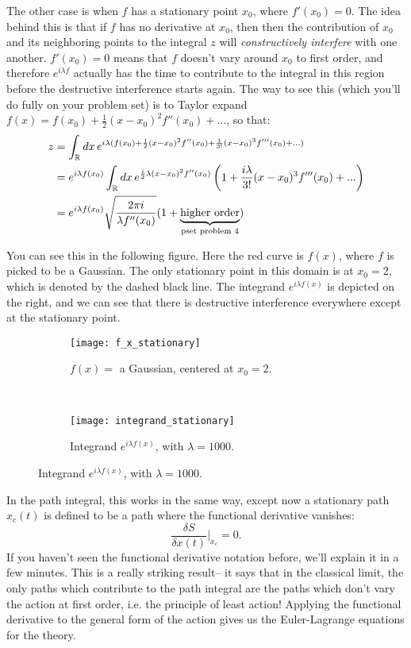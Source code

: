 \documentclass[12pt, oneside]{article}   	%
\theoremstyle{definition}
\begin{document}
\begin{itemize}
	The other case is when $f$ has a stationary point $x_0$, where $f'(x_0) = 0$. The idea behind this is that if $f$ has no derivative at $x_0$, then then the contribution of $x_0$ and its neighboring points to the integral $z$ will \textit{constructively interfere} with one another. $f'(x_0) = 0$ means that $f$ doesn't vary around $x_0$ to first order, and therefore $e^{i\lambda f}$ actually has the time to contribute to the integral in this region before the destructive interference starts again. The way to see this (which you'll do fully on your problem set) is to Taylor expand $f(x) = f(x_0) + \frac{1}{2} (x - x_0)^2 f''(x_0) + ...$, so that:
	\begin{align}
		z &= \int_{\mathbb R} dx \, e^{i\lambda (f(x_0) + \frac{1}{2} (x - x_0)^2 f''(x_0) + \frac{1}{3!} (x - x_0)^3 f'''(x_0) + ...)} \nonumber \\
		&= e^{i\lambda f(x_0)} \int_{\mathbb R} dx \, e^{\frac{i}{2}\lambda (x - x_0)^2 f''(x_0)} \left(1 + \frac{i\lambda}{3!} (x - x_0)^3 f'''(x_0) + ...\right) \\
		&= e^{i\lambda f(x_0)} \sqrt{\frac{2\pi i}{\lambda f''(x_0)}}(1 + \underbrace{\textnormal{higher order}}_{\textnormal{pset problem 4}}) \nonumber
	\end{align}
	
	You can see this in the following figure. Here the red curve is $f(x)$, where $f$ is picked to be a Gaussian. The only stationary point in this domain is at $x_0 = 2$, which is denoted by the dashed black line. The integrand $e^{i\lambda f(x)}$ is depicted on the right, and we can see that there is destructive interference everywhere except at the stationary point. 
	\begin{figure}[H]
		\centering
	   	\begin{subfigure}[t]{0.48\textwidth}
        			\texttt{[image: f\_x\_stationary]}
 			\caption{$f(x) = $ a Gaussian, centered at $x_0 = 2$.}
   		 \end{subfigure}
   		 ~
    		\begin{subfigure}[t]{0.48\textwidth}
        		\texttt{[image: integrand\_stationary]}
       		\caption{Integrand $e^{i \lambda f(x)}$, with $\lambda = 1000$. }
    		\end{subfigure}
	\end{figure}
	
	In the path integral, this works in the same way, except now a stationary path $x_c(t)$ is defined to be a path where the functional derivative vanishes:
	\begin{equation}
		\frac{\delta S}{\delta x(t)}\bigg|_{x_c} = 0.
	\end{equation}
	If you haven't seen the functional derivative notation before, we'll explain it in a few minutes. This is a really striking result-- it says that in the classical limit, the only paths which contribute to the path integral are the paths which don't vary the action at first order, i.e. the principle of least action! Applying the functional derivative to the general form of the action gives us the Euler-Lagrange equations for the theory. 
	

\end{itemize}
\end{document}

